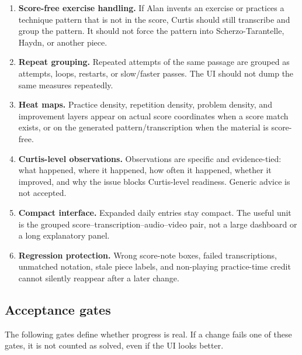 \begin{enumerate}
    \item \textbf{Score-free exercise handling.} If Alan invents an exercise or practices a technique pattern that is not in the score, Curtis should still transcribe and group the pattern. It should not force the pattern into Scherzo-Tarantelle, Haydn, or another piece.
    \item \textbf{Repeat grouping.} Repeated attempts of the same passage are grouped as attempts, loops, restarts, or slow/faster passes. The UI should not dump the same measures repeatedly.
    \item \textbf{Heat maps.} Practice density, repetition density, problem density, and improvement layers appear on actual score coordinates when a score match exists, or on the generated pattern/transcription when the material is score-free.
    \item \textbf{Curtis-level observations.} Observations are specific and evidence-tied: what happened, where it happened, how often it happened, whether it improved, and why the issue blocks Curtis-level readiness. Generic advice is not accepted.
    \item \textbf{Compact interface.} Expanded daily entries stay compact. The useful unit is the grouped score--transcription--audio--video pair, not a large dashboard or a long explanatory panel.
    \item \textbf{Regression protection.} Wrong score-note boxes, failed transcriptions, unmatched notation, stale piece labels, and non-playing practice-time credit cannot silently reappear after a later change.
\end{enumerate}

\subsection{Acceptance gates}

The following gates define whether progress is real. If a change fails one of these gates, it is not counted as solved, even if the UI looks better.

